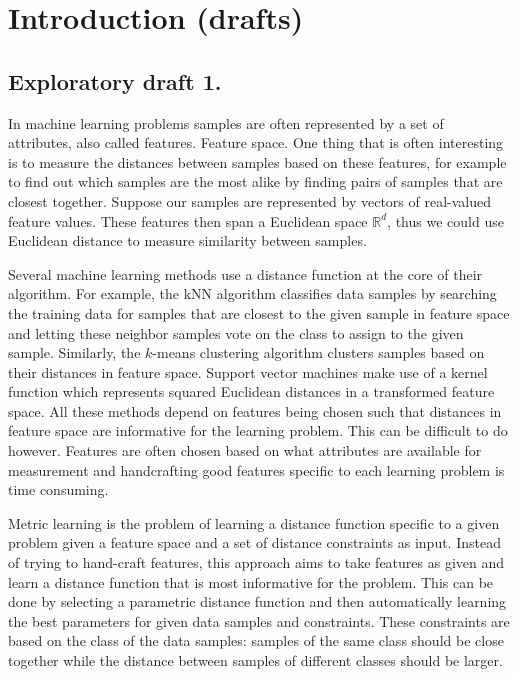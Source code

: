 \section{Introduction (drafts)}



\subsection*{Exploratory draft 1.}

In machine learning problems samples are often represented by a set of attributes, also called features. Feature space. One thing that is often interesting is to measure the distances between samples based on these features, for example to find out which samples are the most alike by finding pairs of samples that are closest together. Suppose our samples are represented by vectors of real-valued feature values. These features then span a Euclidean space $\mathbb{R}^d$, thus we could use Euclidean distance to measure similarity between samples.

Several machine learning methods use a distance function at the core of their algorithm. For example, the \ac{kNN} algorithm classifies data samples by searching the training data for samples that are closest to the given sample in feature space and letting these neighbor samples vote on the class to assign to the given sample. Similarly, the $k$-means clustering algorithm clusters samples based on their distances in feature space. Support vector machines make use of a kernel function which represents squared Euclidean distances in a transformed feature space. All these methods depend on features being chosen such that distances in feature space are informative for the learning problem. This can be difficult to do however. Features are often chosen based on what attributes are available for measurement and handcrafting good features specific to each learning problem is time consuming.

Metric learning is the problem of learning a distance function specific to a given problem given a feature space and a set of distance constraints as input. Instead of trying to hand-craft features, this approach aims to take features as given and learn a distance function that is most informative for the problem. This can be done by selecting a parametric distance function and then automatically learning the best parameters for given data samples and constraints. These constraints are based on the class of the data samples: samples of the same class should be close together while the distance between samples of different classes should be larger. 


